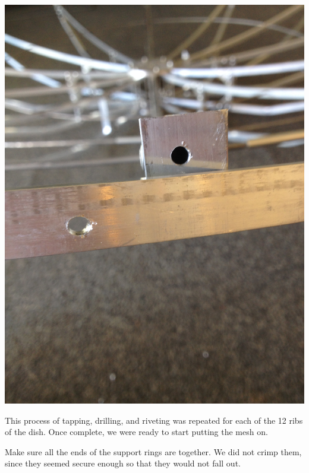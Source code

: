 \documentclass[11pt]{article} %
\begin{document}
\begin{center}
\includegraphics[scale=0.12]{dish/06.jpeg}
\end{center}


This process of tapping, drilling, and riveting was repeated for each of the 12 ribs of the dish. Once complete, we were ready to start putting the mesh on.

Make sure all the ends of the support rings are together. We did not crimp them, since they seemed secure enough so that they would not fall out.
\end{document}

